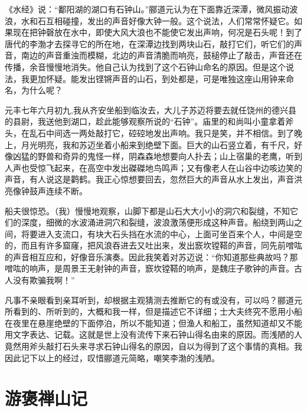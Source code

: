\documentclass[12pt,UTF-8,openany,a4]{ctexbook}
\begin{document}
\begin{large}
    \yiwen 
    《水经》说：“鄱阳湖的湖口有石钟山。”郦道元认为在下面靠近深潭，微风振动波浪，水和石互相碰撞，发出的声音好像大钟一般。这个说法，人们常常怀疑它。如果现在把钟磬放在水中，即使大风大浪也不能使它发出声响，何况是石头呢！到了唐代的李渤才去探寻它的所在地，在深潭边找到两块山石，敲打它们，听它们的声音，南边的声音重浊而模糊，北边的声音清脆而响亮，鼓槌停止了敲击，声音还在传播，余音慢慢地消失。他自己认为找到了这个石钟山命名的原因。但是这个说法，我更加怀疑。能发出铿锵声音的山石，到处都是，可是唯独这座山用钟来命名，为什么呢？
    
    元丰七年六月初九,我从齐安坐船到临汝去，大儿子苏迈将要去就任饶州的德兴县的县尉，我送他到湖口，趁此能够观察所说的“石钟”。庙里的和尚叫小童拿着斧头，在乱石中间选一两处敲打它，硿硿地发出声响。我只是笑，并不相信。到了晚上，月光明亮，我和苏迈坐着小船来到绝壁下面。巨大的山石竖立着，有千尺，好像凶猛的野兽和奇异的鬼怪一样，阴森森地想要向人扑去；山上宿巢的老鹰，听到人声也受惊飞起来，在高空中发出磔磔地鸟鸣声；又有像老人在山谷中边咳边笑的声音，有人说这是鹳鹤。我正心惊想要回去，忽然巨大的声音从水上发出，声音洪亮像钟鼓声连续不断。
    
    船夫很惊恐。（我）慢慢地观察，山脚下都是山石大大小小的洞穴和裂缝，不知它们的深度，细微的水波涌进洞穴和裂缝，波浪激荡便形成这种声音。船绕到两山之间，将要进入支流口，有块大石头挡在水流的中心，上面可坐百来个人，中间是空的，而且有许多窟窿，把风浪吞进去又吐出来，发出窾坎镗鞳的声音，同先前噌吰的声音相互应和，好像音乐演奏。因此我笑着对苏迈说：“你知道那些典故吗？那噌吰的响声，是周景王无射钟的声音，窾坎镗鞳的响声，是魏庄子歌钟的声音。古人没有欺骗我啊！”
    
    凡事不亲眼看到亲耳听到，却根据主观猜测去推断它的有或没有，可以吗？郦道元所看到的、所听到的，大概和我一样，但是描述它不详细；士大夫终究不愿用小船在夜里在悬崖绝壁的下面停泊，所以不能知道；但渔人和船工，虽然知道却又不能用文字表达、记载。这就是世上没有流传下来石钟山得名由来的原因。而浅陋的人竟然用斧头敲打石头来寻求石钟山得名的原因，自以为得到了这个事情的真相。我因此记下以上的经过，叹惜郦道元简略，嘲笑李渤的浅陋。
    
\end{large}



\chapter{游褒禅山记}
\end{document}
